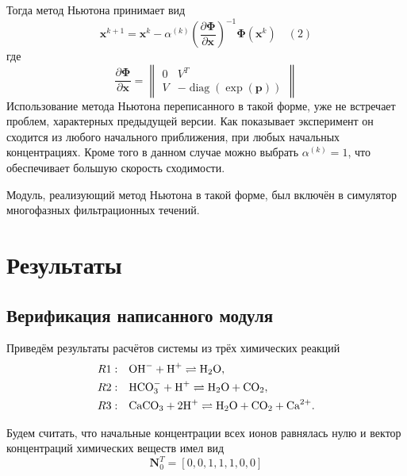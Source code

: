 \documentclass[14pt,a4paper]{extarticle}
\newcommand{\pd}[2]{\frac{\partial #1}{\partial #2}}
\newcommand{\diag}{\operatorname{diag}}
\renewcommand{\vec}[1]{\boldsymbol{\mathbf{#1}}}
\begin{document}
Тогда метод Ньютона принимает вид\\
$$\vec{x}^{k+1} = \vec{x}^{k} - \alpha^{(k)}\left(\pd{\vec{\Phi}}{\vec{x}}\right)^{-1}\vec{\Phi}(\vec x^k) \quad (2)$$
 где $$\pd{\vec{\Phi}}{\vec{x}} = \begin{Vmatrix}
 0 & V^T \\
 V & -\diag({\exp(\vec{p})})
\end{Vmatrix}  $$
Использование метода Ньютона переписанного в такой форме, уже не встречает проблем, характерных предыдущей версии. Как показывает эксперимент он сходится из любого начального приближения, при любых начальных концентрациях. Кроме того в данном случае можно выбрать $\alpha^{(k)} = 1$, что обеспечивает большую скорость сходимости.

Модуль, реализующий метод Ньютона в такой форме, был включён в симулятор многофазных фильтрационных течений. 


\section{Результаты}
\subsection{Верификация написанного модуля}
Приведём результаты расчётов системы из трёх химических реакций 
\begin{align*}
R1:&\quad \text{OH}^- + \text{H}^+ \rightleftharpoons \text{H}_2\text{O},\\
R2:&\quad \text{HCO}_3^{-} +\text{H}^+ \rightleftharpoons \text{H}_2\text{O} + \text{CO}_2,\\
R3:&\quad \text{CaCO}_3 + 2\text{H}^+ \rightleftharpoons \text{H}_2\text{O} + \text{CO}_2 + \text{Ca}^{2+}.
\end{align*}

Будем считать, что начальные концентрации всех ионов равнялась нулю и вектор концентраций химических веществ имел вид
$$\vec{N}_0^T = [0, 0, 1, 1, 1, 0, 0]$$
\end{document}
